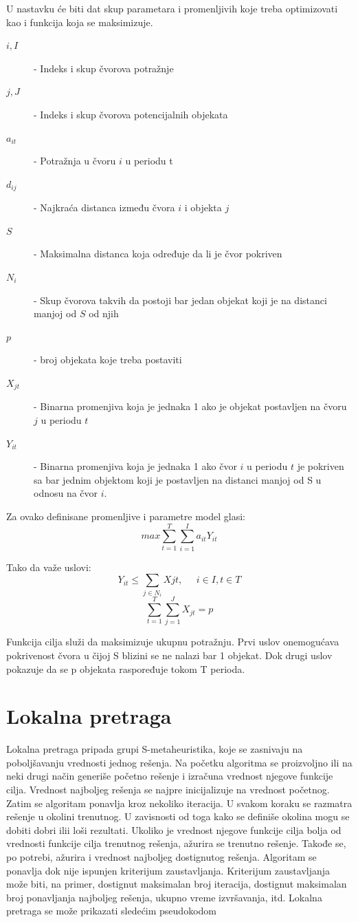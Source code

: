 \documentclass[a4paper]{article}
\begin{document}
U nastavku će biti dat skup parametara i promenljivih koje treba optimizovati kao i funkcija koja se maksimizuje.
\begin{description}
\item[$i, I$]  - Indeks i skup čvorova potražnje
\item[$j, J$]  - Indeks i skup čvorova potencijalnih objekata
\item[$a_{it}$] - Potražnja u čvoru $i$ u periodu t
\item[$d_{ij}$] - Najkraća distanca između čvora $i$ i objekta $j$
\item[$S$] - Maksimalna distanca koja određuje da li je čvor pokriven 
\item[$N_{i}$] - Skup čvorova takvih da postoji bar jedan objekat koji je na distanci manjoj od $S$ od njih
\item[$p$] - broj objekata koje treba postaviti
\item[$X_{jt}$] - Binarna promenjiva koja je jednaka 1 ako je objekat postavljen na čvoru $j$ u periodu $t$
\item[$Y_{it}$] - Binarna promenjiva koja je jednaka 1 ako čvor $i$ u periodu $t$ je pokriven sa bar jednim objektom koji je postavljen na distanci manjoj od S u odnosu na čvor $i$.	
\end{description}


Za ovako definisane promenljive i parametre model glasi:
$$max \sum_{t=1}^{T} \sum_{i=1}^{I} a_{it} Y_{it} $$

Tako da važe uslovi:
$$Y_{it} \leq \sum_{j \in N_{i}} Xjt, \;\;\;\;\; i \in I, t \in T  $$
$$\sum_{t=1}^{T} \sum_{j=1}^{J} X_{jt} = p $$

Funkcija cilja služi da maksimizuje ukupnu potražnju. Prvi uslov onemogućava pokrivenost čvora u čijoj S blizini se ne nalazi bar 1 objekat. Dok drugi uslov pokazuje da se p objekata raspoređuje tokom T perioda. 

\section{Lokalna pretraga}

Lokalna pretraga pripada grupi S-metaheuristika, koje se zasnivaju na poboljšavanju vrednosti jednog
rešenja. Na početku algoritma se proizvoljno ili na neki drugi način generiše početno rešenje i izračuna vrednost njegove funkcije cilja. Vrednost najboljeg rešenja se najpre inicijalizuje na vrednost početnog. Zatim se
algoritam ponavlja kroz nekoliko iteracija. U svakom koraku se razmatra rešenje u okolini trenutnog. U zavisnosti od toga kako se definiše okolina mogu se dobiti dobri ilii loši rezultati. Ukoliko je vrednost njegove funkcije cilja bolja od vrednosti funkcije cilja trenutnog rešenja, ažurira se trenutno
rešenje. Takođe se, po potrebi, ažurira i vrednost najboljeg dostignutog rešenja. Algoritam se ponavlja
dok nije ispunjen kriterijum zaustavljanja. Kriterijum zaustavljanja može biti, na primer, dostignut maksimalan broj iteracija, dostignut maksimalan broj ponavljanja najboljeg rešenja, ukupno vreme izvršavanja,
itd. Lokalna pretraga se može prikazati sledećim pseudokodom
\end{document}
